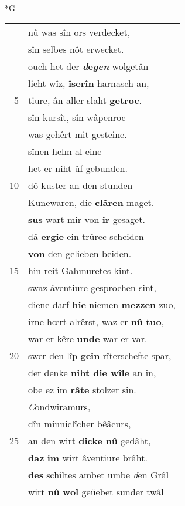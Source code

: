 \documentclass[8pt,a4paper,notitlepage]{article}
\begin{document}
\newpage
\begin{table}[ht]
\begin{minipage}[t]{0.5\linewidth}
\small
\begin{center}*G
\end{center}
\begin{tabular}{rl}
 & nû was sîn ors verdecket,\\ 
 & sîn selbes nôt erwecket.\\ 
 & ouch het der \textbf{\textit{d}e\textit{gen}} wolgetân\\ 
 & lieht wîz, \textbf{îserîn} harnasch an,\\ 
5 & tiure, ân aller slaht \textbf{getroc}.\\ 
 & sîn kursît, sîn wâpenroc\\ 
 & was gehêrt mit gesteine.\\ 
 & sînen helm al eine\\ 
 & het er niht ûf gebunden.\\ 
10 & dô kuster an den stunden\\ 
 & Kunewaren, die \textbf{clâren} maget.\\ 
 & \textbf{sus} wart mir von \textbf{ir} gesaget.\\ 
 & dâ \textbf{ergie} ein trûrec scheiden\\ 
 & \textbf{von} den gelieben beiden.\\ 
15 & hin reit Gahmuretes kint.\\ 
 & swaz âventiure gesprochen sint,\\ 
 & diene darf \textbf{hie} niemen \textbf{mezzen} zuo,\\ 
 & irne hœrt alrêrst, waz er \textbf{nû} \textbf{tuo},\\ 
 & war er kêre \textbf{unde} war er var.\\ 
20 & swer den lîp \textbf{gein} rîterschefte spar,\\ 
 & der denke \textbf{niht die wîle} an in,\\ 
 & obe ez im \textbf{râte} stolzer sin.\\ 
 & \textit{C}ondwiramurs,\\ 
 & dîn minniclîcher bêâcurs,\\ 
25 & an den wirt \textbf{dicke nû} gedâht,\\ 
 & \textbf{daz} \textbf{im} wirt âventiure brâht.\\ 
 & \textbf{des} schiltes ambet umbe \textit{d}en Grâl\\ 
 & wirt \textbf{nû} \textbf{wol} geüebet sunder twâl\\ 

\end{tabular}
\end{minipage}
\end{table}
\end{document}
